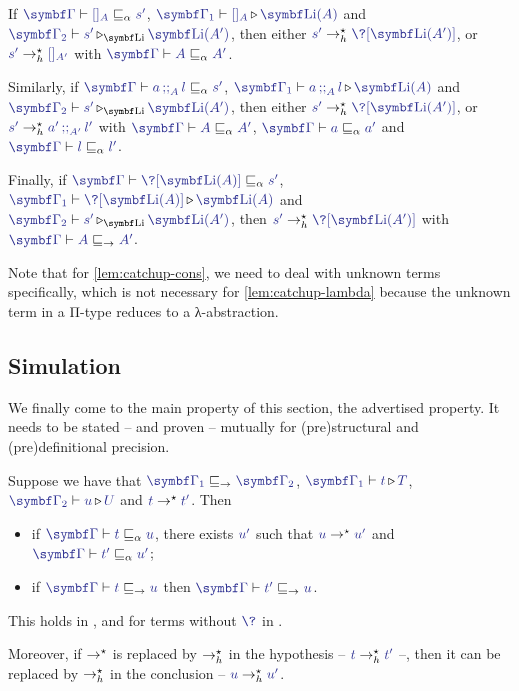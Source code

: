 \begin{lemma}
  \label{lem:catchup-cons}
  If $\tcol{\GG} \vdash \tcol{\lnil[A]} \capre \tcol{s'}$,
  $\cinferty{\fs{\GG}}{\lnil[A]}{\List(A)}$ and
  $\cpinferty{\List}{\sn{\GG}}{s'}{\List(A')}$,
  then either $\tcol{s'} \hred \tcol{\?[\List(A')]}$, or
  $\tcol{s'} \hred \tcol{\lnil[A']}$ with $\tcol{\GG} \vdash \tcol{A} \capre \tcol{A'}$.

  Similarly, if $\tcol{\GG} \vdash \tcol{\lcons[A]{a}{l}} \capre \tcol{s'}$,
  $\cinferty{\fs{\GG}}{\lcons[A]{a}{l}}{\List(A)}$ and
  $\cpinferty{\List}{\sn{\GG}}{s'}{\List(A')}$,
  then either $\tcol{s'} \hred \tcol{\?[\List(A')]}$, or
  $\tcol{s'} \hred \tcol{\lcons[A']{a'}{l'}}$ with
  $\tcol{\GG} \vdash \tcol{A} \capre \tcol{A'}$,
  $\tcol{\GG} \vdash \tcol{a} \capre \tcol{a'}$ and
  $\tcol{\GG} \vdash \tcol{l} \capre \tcol{l'}$.

  Finally, if $\tcol{\GG} \vdash \tcol{\?[\List(A)]} \capre \tcol{s'}$,
  $\cinferty{\fs{\GG}}{\?[\List(A)]}{\List(A)}$ and
  $\cpinferty{\List}{\sn{\GG}}{s'}{\List(A')}$,
  then $\tcol{s'} \hred \tcol{\?[\List(A')]}$ with 
  $\tcol{\GG} \vdash \tcol{A} \cdpre \tcol{A'}$.
\end{lemma}

Note that for \cref{lem:catchup-cons}, we need to deal with unknown terms
specifically, which is not necessary for \cref{lem:catchup-lambda}
because the unknown term in a Π-type reduces to a λ-abstraction.

\subsection{Simulation}

\AP We finally come to the main property of this section, the advertised
 property.
It needs to be stated – and proven – mutually for \kl(pre){structural} and
\kl(pre){definitional} precision.

\begin{theorem}
	\label{thm:simulation}
  Suppose we have that $\tcol{\fs{\GG}} \cdpre \tcol{\sn{\GG}}$,
  $\cinferty{\fs{\GG}}{t}{T}$, $\cinferty{\sn{\GG}}{u}{U}$ and
  $\tcol{t} \red \tcol{t'}$. Then
  \begin{itemize}
  \item
    if $\tcol{\GG} \vdash \tcol{t} \capre \tcol{u}$, there exists $\tcol{u'}$
    such that $\tcol{u} \red \tcol{u'}$ and $\tcol{\GG} \vdash \tcol{t'} \capre \tcol{u'}$;
  \item
    if $\tcol{\GG} \vdash \tcol{t} \cdpre \tcol{u}$ then
    $\tcol{\GG} \vdash \tcol{t'} \cdpre \tcol{u}$.
  \end{itemize}
  This holds in ,  and for terms without $\tcol{\?}$ in .

  Moreover, if $\rightarrow^{\star}$ is replaced by $\rightarrow^{\star}_{h}$ in the hypothesis –
  \ie $\tcol{t} \hred \tcol{t'}$ –, then it can be replaced by $\rightarrow^{\star}_{h}$ in the conclusion –
  \ie $\tcol{u} \hred \tcol{u'}$.
\end{theorem}

